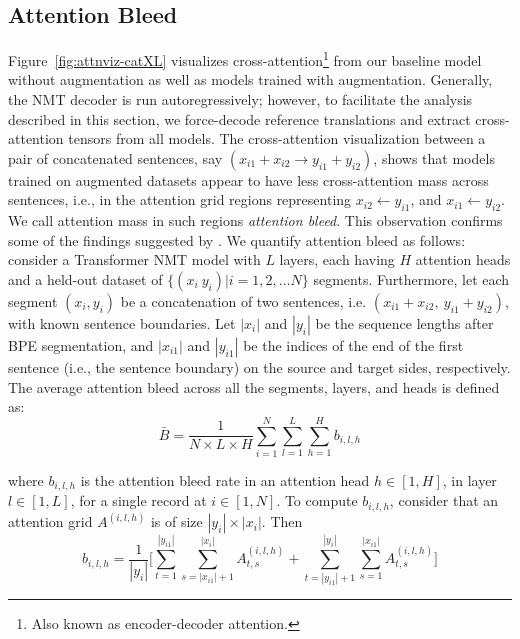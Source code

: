 \subsection{Attention Bleed}
\label{sec:attn-bleed}
Figure~\ref{fig:attnviz-catXL} visualizes cross-attention\footnote{Also known as encoder-decoder attention.} from our baseline model without augmentation as well as models trained with augmentation. 
Generally, the NMT decoder is run autoregressively; however, to facilitate the analysis described in this section, we force-decode reference translations and extract cross-attention tensors from all models.
The cross-attention visualization between a pair of concatenated sentences, say $(x_{i1} + x_{i2} \rightarrow y_{i1} + y_{i2})$, shows that models trained on augmented datasets appear to have less cross-attention mass across sentences, i.e., in the attention grid regions representing $x_{i2} \leftarrow y_{i1}$, and $x_{i1} \leftarrow y_{i2}$. 
We call attention mass in such regions \textit{attention bleed}. 
This observation confirms some of the findings suggested by \citet{nguyen-etal-2021-data}. 
We quantify attention bleed as follows: 
consider a Transformer NMT model with $L$ layers, each having $H$ attention heads and a held-out dataset of $\{(x_i ~ y_i) | i=1,2,...N\}$ segments. 
Furthermore, let each segment $(x_i, y_i) $ be a concatenation of two sentences, i.e. $(x_{i1}+ x_{i2}, ~ y_{i1}+y_{i2})$, with known sentence boundaries.
Let $|x_i|$ and $|y_i|$ be the sequence lengths after BPE segmentation, and $|x_{i1}|$ and $|y_{i1}|$ be the indices of the end of the first sentence (i.e., the sentence boundary) on the source and target sides, respectively.
The average attention bleed across all the segments, layers, and heads is defined as:
$$ \bar{B} = \frac{1}{N \times L \times H} \sum_{i=1}^N \sum_{l=1}^L \sum_{h=1}^H b_{i,l,h}$$

\noindent where $b_{i,l,h}$ is the attention bleed rate in an attention head $h\in[1, H]$, in layer $l \in [1, L]$, for a single record at $i\in[1,N]$. 
To compute $b_{i,l,h}$, consider that an attention grid $A^{(i,l,h)}$ is of size $|y_i|\times|x_i|$. Then 
$$ b_{i,l,h} = \frac{1}{|y_i|} \Big[
      \sum_{t=1}^{|y_{i1}|} \sum_{s=|x_{i1}|+1}^{|x_i|} A^{(i,l,h)}_{t,s} 
    + \sum_{t=|y_{i1}|+1}^{|y_i|} \sum_{s=1}^{|x_{i1}|} A^{(i,l,h)}_{t,s} \Big] $$

